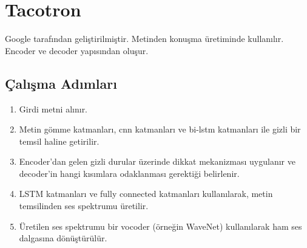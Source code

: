 \section{Tacotron}
Google tarafından geliştirilmiştir. Metinden konuşma üretiminde kullanılır. Encoder ve decoder yapısından oluşur.

\subsection{Çalışma Adımları}
\begin{enumerate}
	\item Girdi metni alınır.
	\item Metin gömme katmanları, cnn katmanları ve bi-lstm katmanları ile gizli bir temsil haline getirilir.
	\item Encoder'dan gelen gizli durular üzerinde dikkat mekanizması uygulanır ve decoder'in hangi kısımlara odaklanması gerektiği belirlenir.
	\item LSTM katmanları ve fully connected katmanları kullanılarak, metin temsilinden ses spektrumu üretilir.
	\item Üretilen ses spektrumu bir vocoder (örneğin WaveNet) kullanılarak ham ses dalgasına dönüştürülür.
\end{enumerate}

\newpage